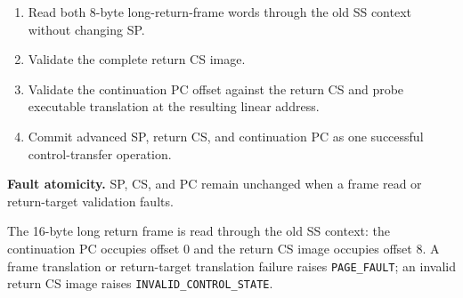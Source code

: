 \begin{enumerate}
\item Read both 8-byte long-return-frame words through the old SS context without changing SP.
\item Validate the complete return CS image.
\item Validate the continuation PC offset against the return CS and probe executable translation at the resulting linear address.
\item Commit advanced SP, return CS, and continuation PC as one successful control-transfer operation.
\end{enumerate}

\textbf{Fault atomicity.} SP, CS, and PC remain unchanged when a frame read or return-target validation faults.

The 16-byte long return frame is read through the old SS context: the continuation PC occupies offset 0 and the return CS
image occupies offset 8. A frame translation or return-target translation failure raises \texttt{PAGE\_FAULT}; an
invalid return CS image raises \texttt{INVALID\_CONTROL\_STATE}.
